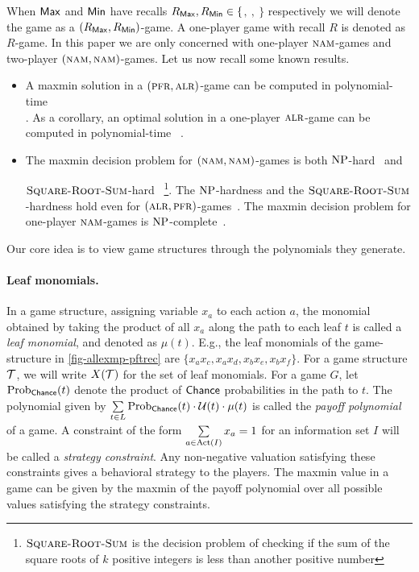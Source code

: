 When $\mathsf{Max}$ and $\mathsf{Min}$ have recalls $R_{\mathsf{Max}}, R_{\mathsf{Min}} \in \{ $\pfr$,~$\alr$,~$\nam$ \} $
respectively we will denote the game as a
$(R_{\mathsf{Max}}, R_{\mathsf{Min}})$-game. A one-player game with recall $R$ is denoted as $R$-game. In this paper we are only concerned with one-player $\textsc{nam}$-games and two-player $(\textsc{nam},\textsc{nam})$-games. Let us now recall some known
results.
\begin{itemize}\item A maxmin solution in a $(\textsc{pfr},\textsc{alr})$-game can be computed in
  polynomial- time~\\\cite{KollerMegiddo::1992,vonStengel::1996,kaneko1995behavior}. As a corollary, an optimal solution in a one-player $\textsc{alr}$-game can be computed in
  polynomial-time ~\cite{kaneko1995behavior}.

\item The maxmin decision problem for $(\textsc{nam},\textsc{nam})$-games is both
  $\operatorname{NP}$-hard~\cite{KollerMegiddo::1992} and

  
  $\textsc{Square-Root-Sum}$-hard~\cite{GPS20} \footnote{$\textsc{Square-Root-Sum}$ is the decision problem of checking
    if the sum of the square roots of $k$ positive integers is less
    than another positive number}.
   The $\operatorname{NP}$-hardness and the $\textsc{Square-Root-Sum}$-hardness hold even for
  $(\textsc{alr},\textsc{pfr})$-games~\cite{Cermak::2018,GPS20}. The maxmin decision problem for one-player $\textsc{nam}$-games is
  $\operatorname{NP}$-complete~\cite{KollerMegiddo::1992}.
\end{itemize}


Our core idea is to view game structures through the polynomials they generate. 
\paragraph*{Leaf monomials.} In a game structure, assigning variable $x_a$ to each action
$a$, the monomial obtained by taking the product of all $x_a$ along the path to each leaf $t$ is called
a \emph{leaf monomial}, and denoted as $\mu(t)$. E.g., the leaf
monomials of the game-structure in \cref{fig-allexmp-pftrec} are
$\{ x_ax_c, x_ax_d, x_bx_e, x_bx_f\}$. For a game structure $\mathcal{T}$, we will write $X(\mathcal{T})$ for the set of leaf monomials. For a game $G$, let
$\mathrm{Prob}_{\mathsf{Chance}}(t)$ denote the product of $\mathsf{Chance}$ probabilities in
the path to $t$. The polynomial given by
$\sum\limits_{t \in L} \mathrm{Prob}_{\mathsf{Chance}}(t) \cdot \mathcal{U}(t) \cdot \mu(t)$
is called the \emph{payoff polynomial} of a game. 
A constraint of the form $\sum\limits_{a \in \operatorname{Act}(I)} x_a = 1$ for an
information set $I$ will be called a \emph{strategy constraint}. Any non-negative valuation satisfying these constraints gives a behavioral strategy to the players.
The maxmin value in a game can be given by the maxmin of the payoff polynomial over all possible values satisfying the strategy constraints.


